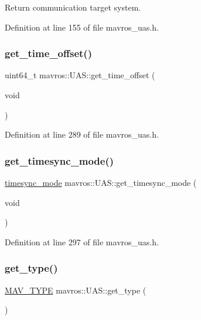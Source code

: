 Return communication target system. 



Definition at line 155 of file mavros\+\_\+uas.\+h.

\mbox{\label{group__nodelib_ga1f582ffa4b83892e65bf2abff10e86e1}} 
\subsubsection{\texorpdfstring{get\_time\_offset()}{get\_time\_offset()}}
{\footnotesize\ttfamily uint64\+\_\+t mavros\+::\+U\+A\+S\+::get\+\_\+time\+\_\+offset (\begin{DoxyParamCaption}\item[{void}]{ }\end{DoxyParamCaption})\hspace{0.3cm}{\ttfamily [inline]}}



Definition at line 289 of file mavros\+\_\+uas.\+h.

\mbox{\label{group__nodelib_ga2284947568b4a2205a500d8c494ae7fa}} 
\subsubsection{\texorpdfstring{get\_timesync\_mode()}{get\_timesync\_mode()}}
{\footnotesize\ttfamily \mbox{\hyperlink{group__mavutils_gac7f53712a7627f397d0eb145c2a16cf7}{timesync\+\_\+mode}} mavros\+::\+U\+A\+S\+::get\+\_\+timesync\+\_\+mode (\begin{DoxyParamCaption}\item[{void}]{ }\end{DoxyParamCaption})\hspace{0.3cm}{\ttfamily [inline]}}



Definition at line 297 of file mavros\+\_\+uas.\+h.

\mbox{\label{group__nodelib_gaeac4cd692aff7e67498a1ad01ea95b9f}} 
\subsubsection{\texorpdfstring{get\_type()}{get\_type()}}
{\footnotesize\ttfamily \mbox{\hyperlink{group__nodelib_ga96b408110c3646b92bef49d32ed1c84b}{M\+A\+V\+\_\+\+T\+Y\+PE}} mavros\+::\+U\+A\+S\+::get\+\_\+type (\begin{DoxyParamCaption}{ }\end{DoxyParamCaption})\hspace{0.3cm}{\ttfamily [inline]}}



